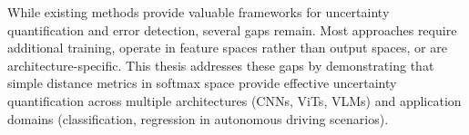 While existing methods provide valuable frameworks for uncertainty quantification and error detection, several gaps remain. Most approaches require additional training, operate in feature spaces rather than output spaces, or are architecture-specific. This thesis addresses these gaps by demonstrating that simple distance metrics in softmax space provide effective uncertainty quantification across multiple architectures (CNNs, ViTs, VLMs) and application domains (classification, regression in autonomous driving scenarios).
